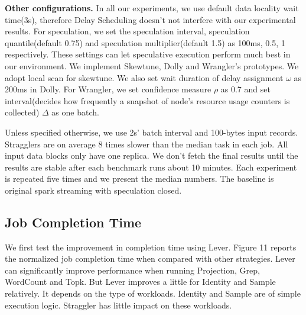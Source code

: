 \documentclass[10pt,conference,compsocconf,letterpaper]{IEEEtran}
\begin{document}
  \textbf{Other configurations.} In all our experiments, we use default data locality wait time(3s), therefore Delay Scheduling \cite{Zaharia2010B} doesn't not interfere with our experimental results. For speculation, we set the speculation interval, speculation quantile(default 0.75) and speculation multiplier(default 1.5) as 100ms, 0.5, 1 respectively. These settings can let speculative execution perform much best in our environment. We implement Skewtune, Dolly and Wrangler's prototypes. We adopt local scan for skewtune. We also set wait duration of delay assignment $\omega$ as 200ms in Dolly. For Wrangler, we set confidence measure $\rho$ as 0.7 and set interval(decides how frequently a snapshot of node's resource usage counters is collected) $\Delta$ as one batch.

  Unless specified otherwise, we use 2s' batch interval and 100-bytes input records. Stragglers are on average 8 times slower than the median task in each job. All input data blocks only have one replica. We don't fetch the final results until the results are stable after each benchmark runs about 10 minutes. Each experiment is repeated five times and we present the median numbers. The baseline is original spark streaming with speculation closed.

\subsection{Job Completion Time}

  We first test the improvement in completion time using Lever. Figure 11 reports the normalized job completion time when compared with other strategies. Lever can significantly improve performance when running Projection, Grep, WordCount and Topk. But Lever improves a little for Identity and Sample relatively. It depends on the type of workloads. Identity and Sample are of simple execution logic. Straggler has little impact on these workloads.
\end{document}
